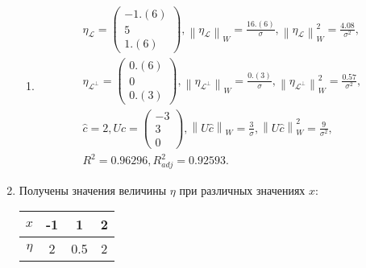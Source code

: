 \documentclass[a4paper,12pt]{article}
\newcommand{\norm}[1]{\left \| #1 \right \|}
\newcommand{\pr}[2]{#1_\mathcal{#2}}
\newcommand{\pro}[2]{#1_{\mathcal{#2}^\perp}}
\begin{document}
\begin{enumerate}
\begin{enumerate}
                  \item
                        \begin{gather*}
                              \pr{\eta}{L} =
                              \begin{pmatrix}
                                    -1.(6) \\
                                    5      \\
                                    1.(6)
                              \end{pmatrix},
                              \norm{\pr{\eta}{L}}_W = \frac{16.(6)}{\sigma} ,
                              \norm{\pr{\eta}{L}}_W^2 = \frac{4.08}{\sigma^2} , \\
                              \pro{\eta}{L} =
                              \begin{pmatrix}
                                    0.(6) \\
                                    0     \\
                                    0.(3)
                              \end{pmatrix} ,
                              \norm{\pro{\eta}{L}}_W = \frac{0.(3)}{\sigma} ,
                              \norm{\pro{\eta}{L}}_W^2 = \frac{0.57}{\sigma^2} , \\
                              \widehat{c} = 2,
                              U \widehat{c} =
                              \begin{pmatrix}
                                    -3 \\
                                    3  \\
                                    0
                              \end{pmatrix},
                              \norm{U \widehat{c}}_W = \frac{3}{\sigma},
                              \norm{U \widehat{c}}_W^2 = \frac{9}{\sigma^2}, \\
                              R^2 = 0.96296, R_{adj}^2 = 0.92593 .
                        \end{gather*}
            \end{enumerate}

      \item Получены значения величины $\eta$ при различных значениях $x$:

            \begin{center}
                  \begin{tabular}{|c|c|c|c|}
                        \hline
                        $x$    & -1 & 1   & 2 \\
                        \hline
                        $\eta$ & 2  & 0.5 & 2 \\
                        \hline
                  \end{tabular}
            \end{center}


\end{enumerate}
\end{document}
